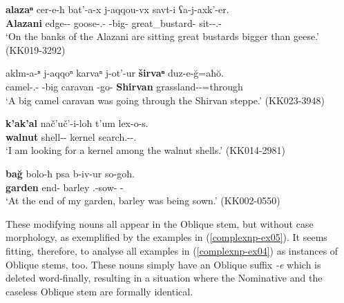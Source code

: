 \begin{exe}
	\ex\label{complexnp-ex04}
	\begin{xlist}
		
		\ex\label{complexnp-ex04a}
		\gll \textbf{alazaⁿ} cer-e-ħ bat'-a-x j-aqqou-vx savt-i ʕa-j-axk'-er. \\
		\textbf{Alazani} edge-{\Obl}-{\Ess} goose-{\Obl}.{\Pl}-{\Cont} {\J}-big-{\Cmp} great\_bustard-{\Pl} sit-{\J}-{\Lv}.{\Pl}-{\Imprf}    \\
		\trans `On the banks of the Alazani are sitting great bustards bigger than geese.'
		\hfill (KK019-3292)
		
		\ex\label{complexnp-ex04b}
		\gll aklm-a-ⁿ j-aqqoⁿ karvaⁿ j-ot'-ur \textbf{širvaⁿ} duz-e-\u{g}=aħ\u{o}.    \\
		camel-{\Obl}.{\Pl}-{\Gen} {\J}-big caravan {\J}-go-{\Imprf} \textbf{Shirvan} grassland-{\Obl}-{\Trans}=through        \\
		\trans `A big camel caravan was going through the Shirvan steppe.'
		\hfill (KK023-3948)
		
		\ex\label{complexnp-ex04c}
		\gll  \textbf{k'ak'al} nač'uč'-i-loħ t'um lex-o-s. \\
		\textbf{walnut} shell-{\Pl}-{\Interess} kernel search.{\Ipfv}-{\Npst}-{\Fsg}.{\Nom}       \\
		\trans `I am looking for a kernel among the walnut shells.'
		\hfill (KK014-2981)
		
		\ex\label{complexnp-ex04d}
		\gll  \textbf{ba\u{g}} bolo-ħ psa b-iv-ur so-goħ. \\
		\textbf{garden} end-{\Ess} barley {\B}.{\Sg}-sow-{\Imprf} {\Fsg}-{\Adess}      \\
		\trans `At the end of my garden, barley was being sown.'
		\hfill (KK002-0550)
		
		
	\end{xlist}
\end{exe}

These modifying nouns all appear in the Oblique stem, but without case morphology, as exemplified by the examples in (\ref{complexnp-ex05}). It seems fitting, therefore, to analyse all examples in (\ref{complexnp-ex04}) as instances of Oblique stems, too. These nouns simply have an Oblique suffix \textit{-e} which is deleted word-finally, resulting in a situation where the Nominative and the caseless Oblique stem are formally identical.

